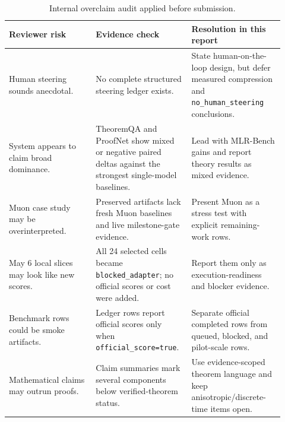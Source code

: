 \documentclass{article}
\begin{document}
\begin{table}[h]
\centering
\caption{Internal overclaim audit applied before submission.}
\label{tab:overclaim_audit}
\small
\begin{tabular}{@{}p{0.30\linewidth}p{0.30\linewidth}p{0.32\linewidth}@{}}
\toprule
\textbf{Reviewer risk} & \textbf{Evidence check} & \textbf{Resolution in this report} \\
\midrule
Human steering sounds anecdotal. & No complete structured steering ledger exists. & State human-on-the-loop design, but defer measured compression and \texttt{no\_human\_steering} conclusions. \\
System appears to claim broad dominance. & TheoremQA and ProofNet show mixed or negative paired deltas against the strongest single-model baselines. & Lead with MLR-Bench gains and report theory results as mixed evidence. \\
Muon case study may be overinterpreted. & Preserved artifacts lack fresh Muon baselines and live milestone-gate evidence. & Present Muon as a stress test with explicit remaining-work rows. \\
May 6 local slices may look like new scores. & All 24 selected cells became \texttt{blocked\_adapter}; no official scores or cost were added. & Report them only as execution-readiness and blocker evidence. \\
Benchmark rows could be smoke artifacts. & Ledger rows report official scores only when \texttt{official\_score=true}. & Separate official completed rows from queued, blocked, and pilot-scale rows. \\
Mathematical claims may outrun proofs. & Claim summaries mark several components below verified-theorem status. & Use evidence-scoped theorem language and keep anisotropic/discrete-time items open. \\
\bottomrule
\end{tabular}
\end{table}
\end{document}

